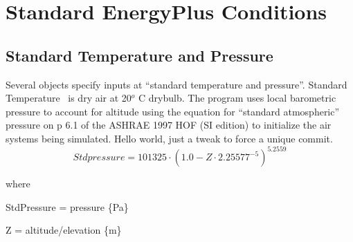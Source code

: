 \section{Standard EnergyPlus Conditions}\label{standard-energyplus-conditions}

\subsection{Standard Temperature and Pressure}\label{standard-temperature-and-pressure}

Several objects specify inputs at ``standard temperature and pressure''. Standard Temperature~ is dry air at 20\(^{o}\) C drybulb. The program uses local barometric pressure to account for altitude using the equation for ``standard atmospheric'' pressure on p 6.1 of the ASHRAE 1997 HOF (SI edition) to initialize the air systems being simulated.
Hello world, just a tweak to force a unique commit.
\begin{equation}
Stdpressure = 101325\cdot {\left( {1.0 - Z\cdot {{2.25577}^{ - 5}}} \right)^{5.2559}}
\end{equation}

where

StdPressure = pressure \{Pa\}

Z = altitude/elevation \{m\}